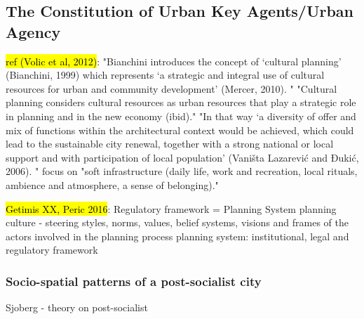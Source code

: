 \documentclass[11pt]{report}
\begin{document}
\subsection{The Constitution of Urban Key Agents/Urban Agency}

\hl{ref (Volic et al, 2012)}:
"Bianchini introduces the concept of ‘cultural planning’ (Bianchini, 1999) which represents ‘a strategic and integral use of cultural  resources  for  urban  and  community development’ (Mercer, 2010). "
"Cultural  planning considers cultural resources as urban resources that play a strategic role in planning and in the
new economy (ibid)."
"In that way ‘a diversity of offer and mix of functions within the architectural context would be achieved, which could  lead  to  the  sustainable  city  renewal, together with a strong national or local support and  with  participation  of  local  population’ (Vaništa Lazarević and Đukić, 2006). "
focus on "soft infrastructure (daily  life, work and recreation, local rituals, ambience and atmosphere, a sense of belonging)."

\hl{Getimis XX, Peric 2016}:
Regulatory framework = Planning System
planning culture -  steering styles, norms, values, belief systems, visions and frames of the actors involved in the planning process
planning system: institutional, legal and regulatory framework

\subsubsection{Socio-spatial patterns of a post-socialist city}

Sjoberg - theory on post-socialist
\end{document}
